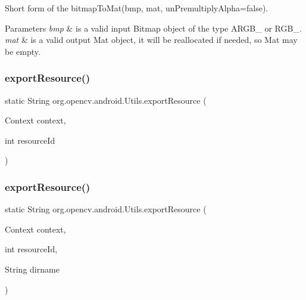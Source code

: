 Short form of the bitmap\+To\+Mat(bmp, mat, un\+Premultiply\+Alpha=false). 
\begin{DoxyParams}{Parameters}
{\em bmp} & is a valid input Bitmap object of the type \textquotesingle{}A\+R\+G\+B\+\_\textquotesingle{} or \textquotesingle{}R\+G\+B\+\_\textquotesingle{}. \\
\hline
{\em mat} & is a valid output Mat object, it will be reallocated if needed, so Mat may be empty. \\
\hline
\end{DoxyParams}
\mbox{\label{classorg_1_1opencv_1_1android_1_1_utils_a26a7a38f69c5de24bb2b4c15dca27567}} 
\subsubsection{\texorpdfstring{export\+Resource()}{exportResource()}\hspace{0.1cm}{\footnotesize\ttfamily [1/2]}}
{\footnotesize\ttfamily static String org.\+opencv.\+android.\+Utils.\+export\+Resource (\begin{DoxyParamCaption}\item[{Context}]{context,  }\item[{int}]{resource\+Id }\end{DoxyParamCaption})\hspace{0.3cm}{\ttfamily [static]}}

\mbox{\label{classorg_1_1opencv_1_1android_1_1_utils_a495b57da9aab4d1793222fd749f22330}} 
\subsubsection{\texorpdfstring{export\+Resource()}{exportResource()}\hspace{0.1cm}{\footnotesize\ttfamily [2/2]}}
{\footnotesize\ttfamily static String org.\+opencv.\+android.\+Utils.\+export\+Resource (\begin{DoxyParamCaption}\item[{Context}]{context,  }\item[{int}]{resource\+Id,  }\item[{String}]{dirname }\end{DoxyParamCaption})\hspace{0.3cm}{\ttfamily [static]}}

